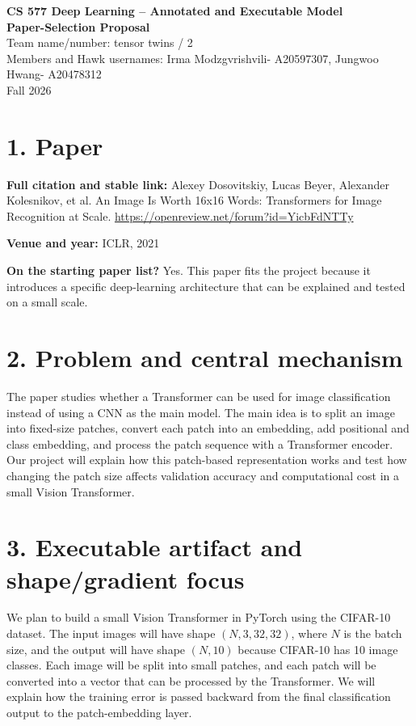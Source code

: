 \documentclass[10pt]{article}
\begin{document}
\begin{center}
{\large\textbf{CS 577 Deep Learning -- Annotated and Executable Model}}\\[-1pt]
{\large\textbf{Paper-Selection Proposal}}\\[2pt]
Team name/number: tensor twins / 2\\

\quad Members and Hawk usernames: Irma Modzgvrishvili- A20597307, Jungwoo Hwang- A20478312\\
\quad Fall 2026
\end{center}
\vspace{-0.5em}

\section*{1. Paper}

\textbf{Full citation and stable link:} Alexey Dosovitskiy, Lucas Beyer, Alexander Kolesnikov, et al. An Image Is Worth 16x16 Words: Transformers for Image Recognition at Scale. \url{https://openreview.net/forum?id=YicbFdNTTy}


\textbf{Venue and year:} ICLR, 2021

\textbf{On the starting paper list?} Yes. This paper fits the project because it introduces a specific deep-learning architecture that can be explained and tested on a small scale.

\section*{2. Problem and central mechanism}


The paper studies whether a Transformer can be used for image classification instead of using a CNN as the main model. The main idea is to split an image into fixed-size patches, convert each patch into an embedding, add positional and class embedding, and process the patch sequence with a Transformer encoder. Our project will explain how this patch-based representation works and test how changing the patch size affects validation accuracy and computational cost in a small Vision Transformer.

\section*{3. Executable artifact and shape/gradient focus}

We plan to build a small Vision Transformer in PyTorch using the CIFAR-10 dataset. The input images will have shape $(N, 3, 32, 32)$, where $N$ is the batch size, and the output will have shape $(N, 10)$ because CIFAR-10 has 10 image classes. Each image will be split into small patches, and each patch will be converted into a vector that can be processed by the Transformer. We will explain how the training error is passed backward from the final classification output to the patch-embedding layer.
\end{document}
